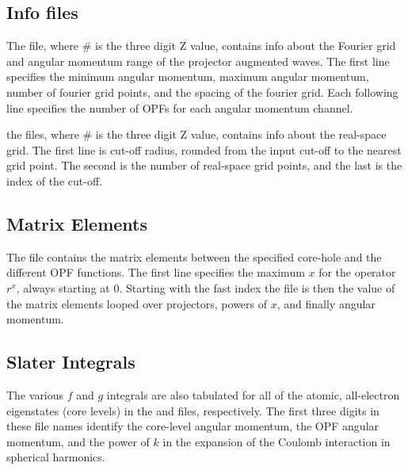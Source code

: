 \documentclass[11pt]{report}
\begin{document}

\subsection{Info files}
The  file, where \# is the three digit Z value, contains info about the Fourier grid and angular momentum range of the projector augmented waves. The first line specifies the minimum angular momentum, maximum angular momentum, number of fourier grid points, and the spacing of the fourier grid. Each following line specifies the number of OPFs for each angular momentum channel. 

the  files, where \# is the three digit Z value, contains info about the real-space grid. The first line is cut-off radius, rounded from the input cut-off to the nearest grid point. The second is the number of real-space grid points, and the last is the index of the cut-off.


\subsection{Matrix Elements}

The  file contains the matrix elements between the specified core-hole and the different OPF functions. The first line specifies the maximum $x$ for the operator $r^x$, always starting at 0. Starting with the fast index the file is then the value of the matrix elements looped over projectors, powers of $x$, and finally angular momentum.

\subsection{Slater Integrals}
The various $f$ and $g$ integrals are also tabulated for all of the atomic, all-electron eigenstates (core levels) in the  and  files, respectively. The first three digits in these file names identify the core-level angular momentum, the OPF angular momentum, and the power of $k$ in the expansion of the Coulomb interaction in spherical harmonics. 
\end{document}
